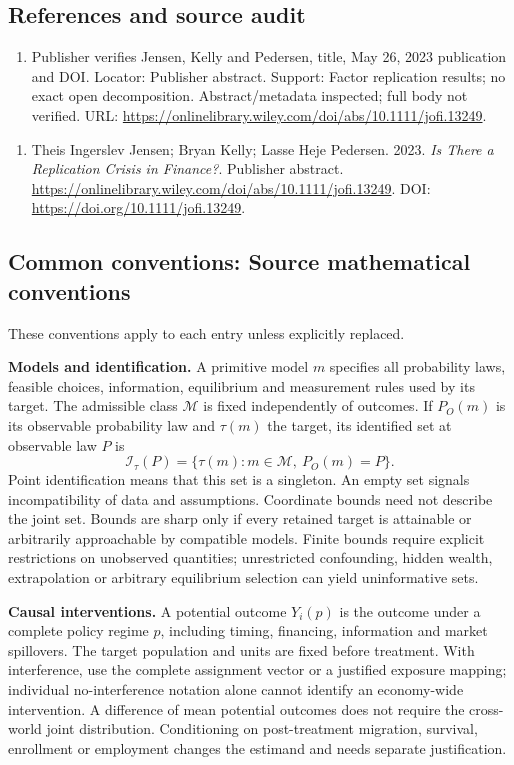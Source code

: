 \documentclass[11pt,a4paper]{article}
\begin{document}
\subsection*{References and source audit}
\begin{enumerate}
\item Publisher verifies Jensen, Kelly and Pedersen, title, May 26, 2023 publication and DOI. Locator: Publisher abstract. Support: Factor replication results; no exact open decomposition. Abstract/metadata inspected; full body not verified. URL: \url{https://onlinelibrary.wiley.com/doi/abs/10.1111/jofi.13249}.
\end{enumerate}
\begin{enumerate}\raggedright
\item\hypertarget{definitions:source:30007596:1}{} Theis Ingerslev Jensen; Bryan Kelly; Lasse Heje Pedersen. 2023. \emph{Is There a Replication Crisis in Finance?}. Publisher abstract.
\url{https://onlinelibrary.wiley.com/doi/abs/10.1111/jofi.13249}.
DOI: \url{https://doi.org/10.1111/jofi.13249}.
\end{enumerate}

\subsection*{Common conventions: Source mathematical conventions}

These conventions apply to each entry unless explicitly replaced.

\textbf{Models and identification.} A primitive model \(m\) specifies all probability laws, feasible choices, information, equilibrium and measurement rules used by its target. The admissible class \(\mathcal M\) is fixed independently of outcomes. If \(P_O(m)\) is its observable probability law and \(\tau(m)\) the target, its identified set at observable law \(P\) is
\[
 \mathcal I_\tau(P)=\{\tau(m):m\in\mathcal M,\ P_O(m)=P\}.
\]
Point identification means that this set is a singleton. An empty set signals incompatibility of data and assumptions. Coordinate bounds need not describe the joint set. Bounds are sharp only if every retained target is attainable or arbitrarily approachable by compatible models. Finite bounds require explicit restrictions on unobserved quantities; unrestricted confounding, hidden wealth, extrapolation or arbitrary equilibrium selection can yield uninformative sets.

\textbf{Causal interventions.} A potential outcome \(Y_i(p)\) is the outcome under a complete policy regime \(p\), including timing, financing, information and market spillovers. The target population and units are fixed before treatment. With interference, use the complete assignment vector or a justified exposure mapping; individual no-interference notation alone cannot identify an economy-wide intervention. A difference of mean potential outcomes does not require the cross-world joint distribution. Conditioning on post-treatment migration, survival, enrollment or employment changes the estimand and needs separate justification.
\end{document}

